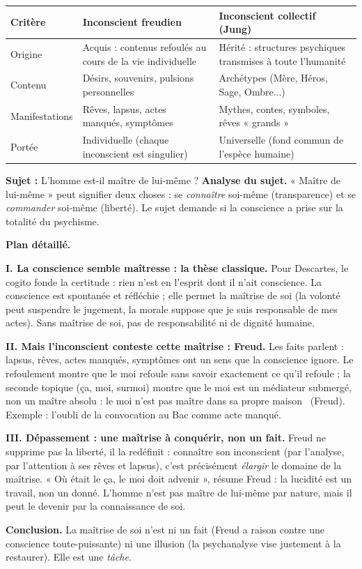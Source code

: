\documentclass[11pt]{article}
\begin{document}
\begin{center}
\begin{tabularx}{\linewidth}{|l|X|X|}
\hline
\rowcolor{popblueL} \textbf{Critère} & \textbf{Inconscient freudien} & \textbf{Inconscient collectif (Jung)} \\
\hline
Origine & Acquis : contenus refoulés au cours de la vie individuelle & Hérité : structures psychiques transmises à toute l'humanité \\
\hline
Contenu & Désirs, souvenirs, pulsions personnelles & Archétypes (Mère, Héros, Sage, Ombre...) \\
\hline
Manifestations & Rêves, lapsus, actes manqués, symptômes & Mythes, contes, symboles, rêves « grands » \\
\hline
Portée & Individuelle (chaque inconscient est singulier) & Universelle (fond commun de l'espèce humaine) \\
\hline
\end{tabularx}
\end{center}

\begin{exoresolu}
\textbf{Sujet :} L'homme est-il maître de lui-même ?
\tcblower
\textbf{Analyse du sujet.} « Maître de lui-même » peut signifier deux choses : se \emph{connaître} soi-même (transparence) et se \emph{commander} soi-même (liberté). Le sujet demande si la conscience a prise sur la totalité du psychisme.

\textbf{Plan détaillé.}

\textbf{I. La conscience semble maîtresse : la thèse classique.} Pour Descartes, le cogito fonde la certitude : rien n'est en l'esprit dont il n'ait conscience. La conscience est spontanée et réfléchie ; elle permet la maîtrise de soi (la volonté peut suspendre le jugement, la morale suppose que je suis responsable de mes actes). Sans maîtrise de soi, pas de responsabilité ni de dignité humaine.

\textbf{II. Mais l'inconscient conteste cette maîtrise : Freud.} Les faits parlent : lapsus, rêves, actes manqués, symptômes ont un sens que la conscience ignore. Le refoulement montre que le moi refoule sans savoir exactement ce qu'il refoule ; la seconde topique (ça, moi, surmoi) montre que le moi est un médiateur submergé, non un maître absolu : \guillemotleft le moi n'est pas maître dans sa propre maison \guillemotright\ (Freud). Exemple : l'oubli de la convocation au Bac comme acte manqué.

\textbf{III. Dépassement : une maîtrise à conquérir, non un fait.} Freud ne supprime pas la liberté, il la redéfinit : connaître son inconscient (par l'analyse, par l'attention à ses rêves et lapsus), c'est précisément \emph{élargir} le domaine de la maîtrise. « Où était le ça, le moi doit advenir », résume Freud : la lucidité est un travail, non un donné. L'homme n'est pas maître de lui-même par nature, mais il peut le devenir par la connaissance de soi.

\textbf{Conclusion.} La maîtrise de soi n'est ni un fait (Freud a raison contre une conscience toute-puissante) ni une illusion (la psychanalyse vise justement à la restaurer). Elle est une \emph{tâche}.
\end{exoresolu}
\end{document}
